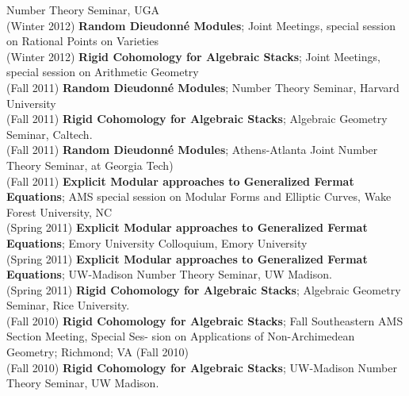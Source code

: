 \documentclass[margin,line]{res}
\begin{document}
\begin{resume}
Number Theory Seminar, UGA
\vspace{.05cm}\\
(Winter 2012) \textbf{Random Dieudonn\'e Modules};
Joint Meetings, special session on Rational Points on Varieties
\vspace{.05cm}\\
(Winter 2012) \textbf{Rigid Cohomology for Algebraic Stacks};
Joint Meetings, special session on Arithmetic Geometry
\vspace{.05cm}\\
(Fall 2011) \textbf{Random Dieudonn\'e Modules};
Number Theory Seminar, Harvard University
\vspace{.05cm}\\
(Fall 2011) \textbf{Rigid Cohomology for Algebraic Stacks};
Algebraic Geometry Seminar, Caltech.
\vspace{.05cm}\\
(Fall 2011) \textbf{Random Dieudonn\'e Modules};
Athens-Atlanta Joint Number Theory Seminar, at Georgia Tech)
\vspace{.05cm}\\
(Fall 2011) \textbf{Explicit Modular approaches to Generalized Fermat Equations};
AMS special session on Modular Forms and Elliptic Curves, Wake Forest University, NC
\vspace{.05cm}\\
(Spring 2011) \textbf{Explicit Modular approaches to Generalized Fermat Equations};
Emory University Colloquium, Emory University
\vspace{.05cm}\\
(Spring 2011) \textbf{Explicit Modular approaches to Generalized Fermat Equations};
 UW-Madison Number Theory Seminar, UW Madison.
\vspace{.05cm}\\
(Spring 2011) \textbf{Rigid Cohomology for Algebraic Stacks};
Algebraic Geometry Seminar, Rice University.
\vspace{.05cm}\\
(Fall 2010) \textbf{Rigid Cohomology for Algebraic Stacks};
Fall Southeastern AMS Section Meeting, Special Ses-
sion on Applications of Non-Archimedean Geometry; Richmond; VA (Fall 2010)
\vspace{.05cm}\\
(Fall 2010) \textbf{Rigid Cohomology for Algebraic Stacks};
 UW-Madison Number Theory Seminar, UW Madison.
\vspace{.05cm}\\

\end{resume}
\end{document}
